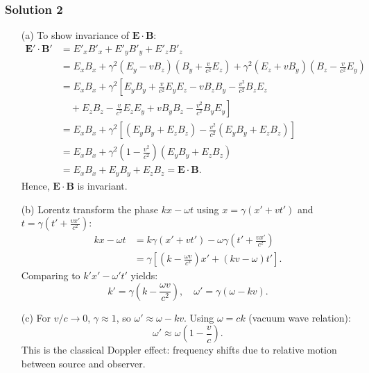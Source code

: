 \documentclass{article}
\begin{document}
\subsubsection{Solution 2}
\begin{enumerate}
    \item[(a)] To show invariance of $\mathbf{E} \cdot \mathbf{B}$:
    \begin{align*}
        \mathbf{E}' \cdot \mathbf{B}' &= E'_x B'_x + E'_y B'_y + E'_z B'_z \\
        &= E_x B_x + \gamma^2 (E_y - v B_z)\left(B_y + \frac{v}{c^2} E_z\right) + \gamma^2 (E_z + v B_y)\left(B_z - \frac{v}{c^2} E_y\right) \\
        &= E_x B_x + \gamma^2 \left[ E_y B_y + \frac{v}{c^2} E_y E_z - v B_z B_y - \frac{v^2}{c^2} B_z E_z \right. \\
        &\quad + \left. E_z B_z - \frac{v}{c^2} E_z E_y + v B_y B_z - \frac{v^2}{c^2} B_y E_y \right] \\
        &= E_x B_x + \gamma^2 \left[ (E_y B_y + E_z B_z) - \frac{v^2}{c^2}(E_y B_y + E_z B_z) \right] \\
        &= E_x B_x + \gamma^2 (1 - \frac{v^2}{c^2})(E_y B_y + E_z B_z) \\
        &= E_x B_x + E_y B_y + E_z B_z = \mathbf{E} \cdot \mathbf{B}.
    \end{align*}
    Hence, $\mathbf{E} \cdot \mathbf{B}$ is invariant.
    
    \item[(b)] Lorentz transform the phase $k x - \omega t$ using $x = \gamma(x' + v t')$ and $t = \gamma(t' + \frac{v x'}{c^2})$:
    \begin{align*}
        k x - \omega t &= k \gamma(x' + v t') - \omega \gamma\left(t' + \frac{v x'}{c^2}\right) \\
        &= \gamma\left[(k - \frac{\omega v}{c^2}) x' + (k v - \omega) t'\right].
    \end{align*}
    Comparing to $k' x' - \omega' t'$ yields:
    \[
        k' = \gamma\left(k - \frac{\omega v}{c^2}\right), \quad \omega' = \gamma(\omega - k v).
    \]
    
    \item[(c)] For $v/c \to 0$, $\gamma \approx 1$, so $\omega' \approx \omega - k v$. Using $\omega = c k$ (vacuum wave relation):
    \[
        \omega' \approx \omega \left(1 - \frac{v}{c}\right).
    \]
    This is the classical Doppler effect: frequency shifts due to relative motion between source and observer.
\end{enumerate}
\end{document}
